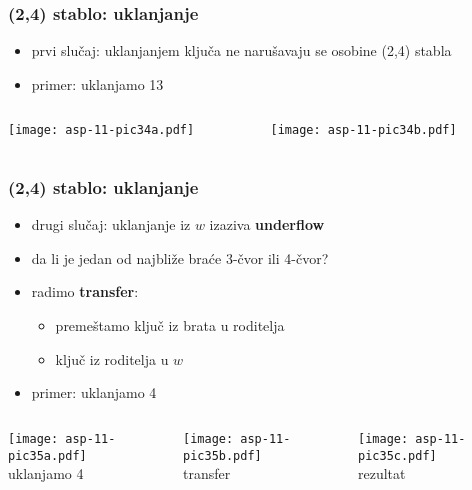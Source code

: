 \documentclass[compress,aspectratio=169]{beamer}
\begin{document}
\begin{frame}[fragile]
  \frametitle{(2,4) stablo: uklanjanje}
  \begin{itemize}
    \item prvi slučaj: uklanjanjem ključa ne narušavaju se osobine (2,4) stabla
    \item primer: uklanjamo 13
  \end{itemize}
  \begin{columns}
    \begin{column}[c]{6cm}
      \begin{center}
        \texttt{[image: asp-11-pic34a.pdf]}
      \end{center}
    \end{column}
    \begin{column}[c]{6cm}
      \begin{center}
        \texttt{[image: asp-11-pic34b.pdf]}
      \end{center}
    \end{column}
  \end{columns}
\end{frame}

\begin{frame}[fragile]
  \frametitle{(2,4) stablo: uklanjanje}
  \begin{itemize}
    \item drugi slučaj: uklanjanje iz $w$ izaziva \textbf{underflow}
    \item da li je jedan od najbliže braće 3-čvor ili 4-čvor?
    \item radimo \textbf{transfer}:
    \begin{itemize}
      \item premeštamo ključ iz brata u roditelja
      \item ključ iz roditelja u $w$
    \end{itemize}
    \item primer: uklanjamo 4
  \end{itemize}
  \begin{columns}
    \begin{column}[c]{4cm}
      \begin{center}
        \texttt{[image: asp-11-pic35a.pdf]}
      \\ uklanjamo 4
      \end{center}
    \end{column}
    \begin{column}[c]{4cm}
      \begin{center}
        \texttt{[image: asp-11-pic35b.pdf]}
      \\ transfer
      \end{center}
    \end{column}
    \begin{column}[c]{4cm}
      \begin{center}
        \texttt{[image: asp-11-pic35c.pdf]}
      \\ rezultat
      \end{center}
    \end{column}
  \end{columns}
\end{frame}
\end{document}
